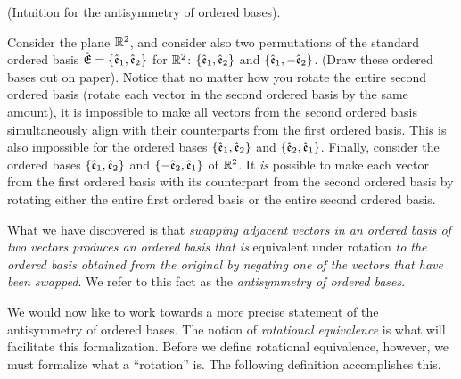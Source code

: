 \begin{deriv}
\label{ch::exterior_pwrs::deriv::ordered_bases_antisymmetry_intuition}
    (Intuition for the antisymmetry of ordered bases).
    
    Consider the plane $\mathbb{R}^2$, and consider also two permutations of the standard ordered basis ${\hat{\mathfrak{E}}} = \{\hat{\mathfrak{e}}_1, \hat{\mathfrak{e}}_2\}$ for $\mathbb{R}^2$: $\{\hat{\mathfrak{e}}_1, \hat{\mathfrak{e}}_2\}$ and $\{\hat{\mathfrak{e}}_1, -\hat{\mathfrak{e}}_2\}$. (Draw these ordered bases out on paper). Notice that no matter how you rotate the entire second ordered basis (rotate each vector in the second ordered basis by the same amount), it is impossible to make all vectors from the second ordered basis simultaneously align with their counterparts from the first ordered basis. This is also impossible for the ordered bases $\{\hat{\mathfrak{e}}_1, \hat{\mathfrak{e}}_2\}$ and $\{\hat{\mathfrak{e}}_2, \hat{\mathfrak{e}}_1\}$. Finally, consider the ordered bases $\{\hat{\mathfrak{e}}_1, \hat{\mathfrak{e}}_2\}$ and $\{-\hat{\mathfrak{e}}_2, \hat{\mathfrak{e}}_1\}$ of $\mathbb{R}^2$. It \textit{is} possible to make each vector from the first ordered basis with its counterpart from the second ordered basis by rotating either the entire first ordered basis or the entire second ordered basis.
    
    What we have discovered is that \textit{swapping adjacent vectors in an ordered basis of two vectors produces an ordered basis that is} equivalent under rotation \textit{to the ordered basis obtained from the original by negating one of the vectors that have been swapped}. We refer to this fact as the \textit{antisymmetry of ordered bases}.
\end{deriv}

We would now like to work towards a more precise statement of the antisymmetry of ordered bases. The notion of \textit{rotational equivalence} is what will facilitate this formalization. Before we define rotational equivalence, however, we must formalize what a ``rotation'' is. The following definition accomplishes this.

